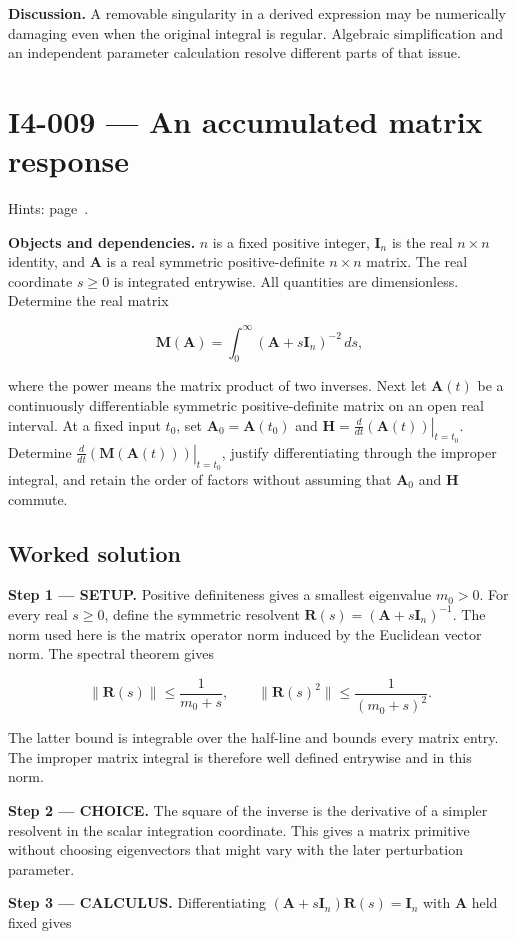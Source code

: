 \documentclass[11pt,oneside,openany]{book}
\begin{document}
\textbf{Discussion.} A removable singularity in a derived expression may be numerically damaging even when the original integral is regular. Algebraic simplification and an independent parameter calculation resolve different parts of that issue.
\clearpage
\section{I4-009 --- An accumulated matrix response}
\label{problem:I4-009}
{\small Hints: page~\pageref{hints:I4-009}.}\par\medskip

\textbf{Objects and dependencies.} \(n\) is a fixed positive integer, \(\mathbf I_n\) is the real \(n\times n\) identity, and \(\mathbf A\) is a real symmetric positive-definite \(n\times n\) matrix. The real coordinate \(s\ge0\) is integrated entrywise. All quantities are dimensionless. Determine the real matrix

\[
\mathbf M(\mathbf A)=\int_0^\infty(\mathbf A+s\mathbf I_n)^{-2}\,ds,
\]

where the power means the matrix product of two inverses. Next let \(\mathbf A(t)\) be a continuously differentiable symmetric positive-definite matrix on an open real interval. At a fixed input \(t_0\), set \(\mathbf A_0=\mathbf A(t_0)\) and \(\mathbf H=\left.\frac{d}{dt}(\mathbf A(t))\right|_{t=t_0}\). Determine \(\left.\frac{d}{dt}(\mathbf M(\mathbf A(t)))\right|_{t=t_0}\), justify differentiating through the improper integral, and retain the order of factors without assuming that \(\mathbf A_0\) and \(\mathbf H\) commute.
\subsection*{Worked solution}

\textbf{Step 1 --- SETUP.} Positive definiteness gives a smallest eigenvalue \(m_0>0\). For every real \(s\ge0\), define the symmetric resolvent \(\mathbf R(s)=(\mathbf A+s\mathbf I_n)^{-1}\). The norm used here is the matrix operator norm induced by the Euclidean vector norm. The spectral theorem gives

\[
\|\mathbf R(s)\|\le\frac{1}{m_0+s},\qquad
\|\mathbf R(s)^2\|\le\frac{1}{(m_0+s)^2}.
\]

The latter bound is integrable over the half-line and bounds every matrix entry. The improper matrix integral is therefore well defined entrywise and in this norm.

\begin{ChoiceStep}
\textbf{Step 2 --- CHOICE.} The square of the inverse is the derivative of a simpler resolvent in the scalar integration coordinate. This gives a matrix primitive without choosing eigenvectors that might vary with the later perturbation parameter.

\end{ChoiceStep}
\textbf{Step 3 --- CALCULUS.} Differentiating \((\mathbf A+s\mathbf I_n)\mathbf R(s)=\mathbf I_n\) with \(\mathbf A\) held fixed gives
\end{document}
